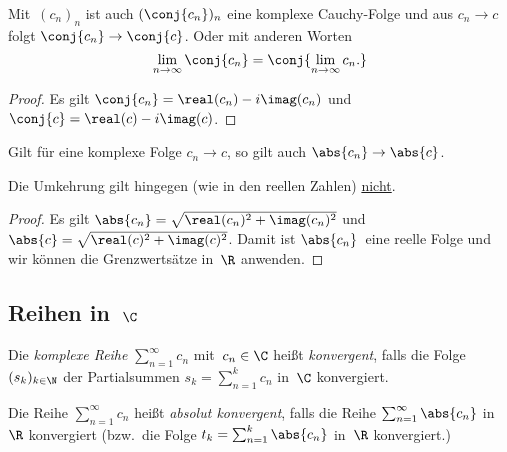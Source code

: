 \documentclass[a4paper]{article}
\begin{document}
\begin{corollary}\label{cor:complex:sequence:conjugate}
    Mit~$(c_n)_n$ ist auch $(\conj{c_n})_n$ eine komplexe Cauchy-Folge und aus $c_n \to c$ folgt $\conj{c_n} \to \conj{c}$. Oder mit anderen Worten
    \begin{equation*}
        \lim_{n\to\infty} \conj{c_n} = \conj{\lim_{n\to\infty} c_n.}
    \end{equation*}
\end{corollary}

\begin{proof}
    Es gilt $\conj{c_n} = \real(c_n)-i\imag(c_n)$ und $\conj{c} = \real(c)-i\imag(c)$.
\end{proof}

\begin{corollary}
    Gilt für eine komplexe Folge $c_n \to c$, so gilt auch $\abs{c_n} \to \abs{c}$.
\end{corollary}

Die Umkehrung gilt hingegen (wie in den reellen Zahlen) \underline{nicht}.

\begin{proof}
    Es gilt $\abs{c_n} = \sqrt{\real(c_n)^2+\imag(c_n)^2}$ und $\abs{c} = \sqrt{\real(c)^2+\imag(c)^2}$. Damit ist $\abs{c_n}$~eine reelle Folge und wir können die Grenzwertsätze in~$\R$ anwenden.
\end{proof}

\subsection{Reihen in~\texorpdfstring{$\C$}{C}}

\begin{definition}
    Die \emph{komplexe Reihe} $\sum_{n=1}^\infty c_n$ mit~$c_n \in \C$ heißt \emph{konvergent}, falls die Folge $(s_k)_{k\in\N}$ der Partialsummen $s_k = \sum_{n=1}^k c_n$ in~$\C$ konvergiert.

    Die Reihe $\sum_{n=1}^\infty c_n$ heißt \emph{absolut konvergent}, falls die Reihe $\sum_{n=1}^\infty \abs{c_n}$ in~$\R$ konvergiert (bzw.\ die Folge $t_k = \sum_{n=1}^k \abs{c_n}$ in~$\R$ konvergiert.)
\end{definition}
\end{document}
